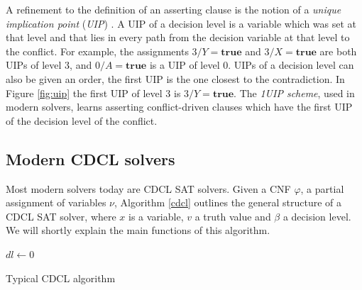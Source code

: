 \documentclass[12pt]{diicc}
\begin{document}
A refinement to the definition of an asserting clause is the notion of a \textit{unique implication point} (\textit{UIP}) \cite{grasp,DBLP}. A UIP of a decision level is a variable which was set at that level and that lies in every path from the decision variable at that level to the conflict. For example, the assignments $3/Y=\textbf{true}$ and $3/X=\textbf{true}$ are both UIPs of level 3, and $0/A=\textbf{true}$ is a UIP of level 0. UIPs of a decision level can also be given an order, the first UIP is the one closest to the contradiction. In Figure \ref{fig:uip} the first UIP of level 3 is $3/Y=\textbf{true}$. The \textit{1UIP scheme}, used in modern solvers, learns asserting conflict-driven clauses which have the first UIP of the decision level of the conflict. 

\subsection{Modern CDCL solvers}

Most modern solvers today are CDCL SAT solvers. Given a CNF $\varphi$, a partial assignment of variables $\nu$, Algorithm \ref{cdcl} outlines the general structure of a CDCL SAT solver, where $x$ is a variable, $v$ a truth value and $\beta$ a decision level. We will shortly explain the main functions of this algorithm.

\begin{algorithm}
$dl \leftarrow 0$\\
\caption{Typical CDCL algorithm\label{cdcl}}
\end{algorithm}
\end{document}
